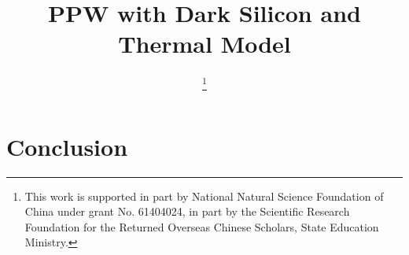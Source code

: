 \documentclass{IEEEtran}
\begin{document}
%
\title{PPW with Dark Silicon and Thermal Model}



\author{

 \thanks{
This work is supported in part by National Natural Science Foundation of China under grant No. 61404024, in part by the Scientific Research Foundation for the Returned Overseas Chinese Scholars, State Education Ministry.
}
}

\maketitle


\maketitle




\section{Conclusion}\label{sec:conclusion}



\end{document}
